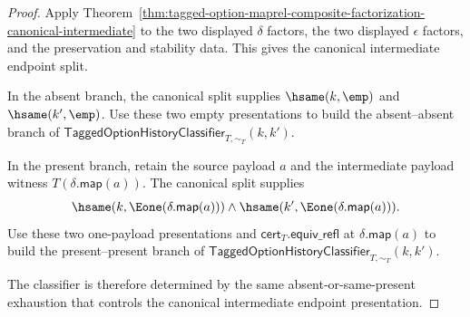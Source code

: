 \begin{proof}
Apply
Theorem~\ref{thm:tagged-option-maprel-composite-factorization-canonical-intermediate}
to the two displayed $\delta$ factors, the two displayed $\epsilon$ factors,
and the preservation and stability data. This gives the canonical intermediate
endpoint split.

In the absent branch, the canonical split supplies
$\hsame(k,\emp)$ and $\hsame(k',\emp)$. Use these two empty presentations to
build the absent--absent branch of
$\mathsf{TaggedOptionHistoryClassifier}_{T,\sim_T}(k,k')$.

In the present branch, retain the source payload $a$ and the intermediate
payload witness $T(\delta.\mathsf{map}(a))$. The canonical split supplies
$$
\hsame(k,\Eone(\delta.\mathsf{map}(a)))
\land
\hsame(k',\Eone(\delta.\mathsf{map}(a))).
$$
Use these two one-payload presentations and
$\mathsf{cert}_T.\mathsf{equiv\_refl}$ at
$\delta.\mathsf{map}(a)$ to build the present--present branch of
$\mathsf{TaggedOptionHistoryClassifier}_{T,\sim_T}(k,k')$.

The classifier is therefore determined by the same absent-or-same-present
exhaustion that controls the canonical intermediate endpoint presentation.
\end{proof}
